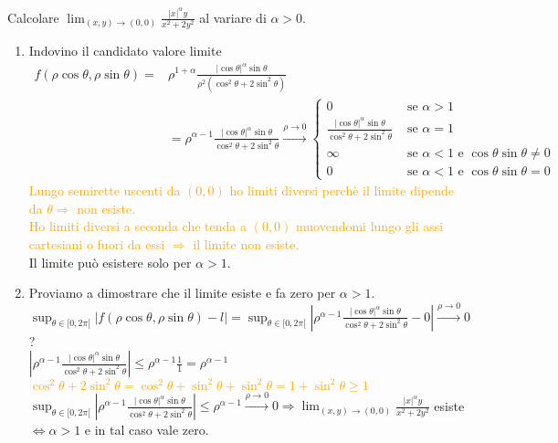 \begin{exbar}
\begin{example}
	
	Calcolare $\lim_{(x,y)\rightarrow(0,0)}\frac{|x|^\alpha y}{x^2+2y^2}$ al variare di $\alpha >0$.
	\begin{enumerate}
		\item Indovino il candidato valore limite
		\begin{align*}
			f(\rho\cos\theta,\rho\sin\theta)=&\rho^{1+\alpha}\frac{|\cos\theta|^\alpha\sin\theta}{\rho^2(\cos^2\theta+2\sin^2\theta)}\\
			&=\rho^{\alpha-1}\frac{|\cos\theta|^\alpha \sin\theta}{\cos^2\theta+2\sin^2\theta}\xrightarrow{\rho\rightarrow0}\begin{cases}
				0 &\text{  se  } \alpha > 1\\
				\frac{|\cos\theta|^\alpha \sin \theta}{\cos^2\theta+2\sin^2\theta}&\text{  se  } \alpha=1\\
				\infty &\text{  se  } \alpha < 1 \text{  e   } \cos\theta \sin\theta \neq 0\\
				0 &\text{  se  } \alpha < 1  \text{  e   } \cos\theta \sin\theta = 0
			\end{cases}
		\end{align*}
		\textcolor{orange}{Lungo semirette uscenti da $(0,0)$ ho limiti diversi perchè il limite dipende da $\theta \Rightarrow$ non esiste.\\Ho limiti diversi a seconda che tenda a $(0,0)$ muovendomi lungo gli assi cartesiani o fuori da essi $\Rightarrow$ il limite non esiste.}\\
		Il limite può esistere solo per $\alpha > 1$.
		\item Proviamo a dimostrare che il limite esiste e fa zero per $\alpha >1$.\\
		$\sup_{\theta \in [0,2\pi[}|f(\rho\cos\theta,\rho\sin\theta)-l|=\sup_{\theta \in [0,2\pi[}|\rho^{\alpha-1}\frac{|\cos \theta|^\alpha \sin\theta}{\cos^2\theta+2\sin^2\theta}-0|\xrightarrow{\rho\rightarrow0}0$?\\
		$ |\rho^{\alpha-1}\frac{|\cos \theta|^\alpha \sin\theta}{\cos^2\theta+2\sin^2\theta}| \leq \rho^{\alpha-1}\frac{1}{1}=\rho^{\alpha-1}$\\
		\textcolor{orange}{$\cos^2\theta+2\sin^2\theta=\cos^2\theta+\sin^2\theta+\sin^2\theta=1+\sin^2\theta \geq 1$}\\
		$\sup_{\theta \in [0,2\pi[}|\rho^{\alpha-1}\frac{|\cos\theta|^\alpha\sin\theta}{\cos^2\theta+2\sin^2\theta}|\leq \rho^{\alpha-1}\xrightarrow{\rho\rightarrow0}0 \Rightarrow \lim_{(x,y)\rightarrow(0,0)}\frac{|x|^\alpha y}{x^2+2y^2}$ esiste $\Leftrightarrow \alpha> 1$ e in tal caso vale zero. 
	\end{enumerate}
\end{example}
\end{exbar}

